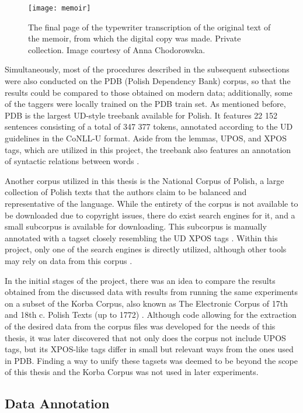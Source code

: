 \begin{figure}[h]
\centering
\texttt{[image: memoir]}
\caption{\label{fig:memoir} The final page of the typewriter transcription of the original text of the memoir, from which the digital copy was made. Private collection. Image courtesy of Anna Chodorowska.}
\end{figure}

Simultaneously, most of the procedures described in the subsequent subsections were also conducted on the PDB (Polish Dependency Bank) corpus, so that the results could be compared to those obtained on modern data; additionally, some of the taggers were locally trained on the PDB train set. As mentioned before, PDB is the largest UD-style treebank available for Polish. It features 22 152 sentences consisting of a total of 347 377 tokens, annotated according to the UD guidelines in the CoNLL-U format. Aside from the lemmas, UPOS, and XPOS tags, which are utilized in this project, the treebank also features an annotation of syntactic relations between words \citep{wroblewska-2018-extended, universaldependencies}.

Another corpus utilized in this thesis is the National Corpus of Polish, a large collection of Polish texts that the authors claim to be balanced and representative of the language. While the entirety of the corpus is not available to be downloaded due to copyright issues, there do exist search engines for it, and a small subcorpus is available for downloading. This subcorpus is manually annotated with a tagset closely resembling the UD XPOS tags \citep{nkjp}. Within this project, only one of the search engines is directly utilized, although other tools may rely on data from this corpus \citep{pęzik_2012}.

In the initial stages of the project, there was an idea to compare the results obtained from the discussed data with results from running the same experiments on a subset of the Korba Corpus, also known as The Electronic Corpus of 17th and 18th c. Polish Texts (up to 1772) \citep{korba}. Although code allowing for the extraction of the desired data from the corpus files was developed for the needs of this thesis, it was later discovered that not only does the corpus not include UPOS tags, but its XPOS-like tags differ in small but relevant ways from the ones used in PDB. Finding a way to unify these tagsets was deemed to be beyond the scope of this thesis and the Korba Corpus was not used in later experiments. 

\subsection{Data Annotation}
\label{subsec:annotation}

